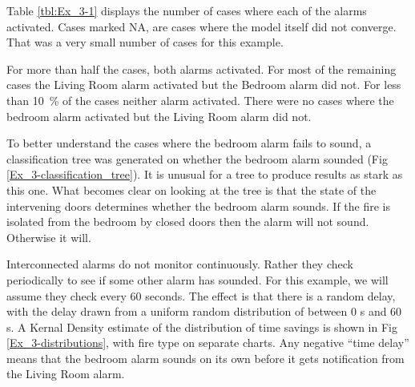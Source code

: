 \documentclass[12pt,twoside]{book}
\begin{document}
Table \ref{tbl:Ex_3-1} displays the number of cases where each of the alarms activated. Cases marked NA, are cases where the model itself did not converge. That was a very small number of cases for this example.

For more than half the cases, both alarms activated. For most of the remaining cases the Living Room alarm activated but the Bedroom alarm did not. For less than 10~\% of the cases neither alarm activated. There were no cases where the bedroom alarm activated but the Living Room alarm did not.

To better understand the cases where the bedroom alarm fails to sound, a classification tree was generated on whether the bedroom alarm sounded (Fig \ref{Ex_3-classification_tree}). It is unusual for a tree to produce results as stark as this one. What becomes clear on looking at the tree is that the state of the intervening doors determines whether the bedroom alarm sounds. If the fire is isolated from the bedroom by closed doors then the alarm will not sound. Otherwise it will.

Interconnected alarms do not monitor continuously. Rather they check periodically to see if some other alarm has sounded. For this example, we will assume they check every 60 seconds. The effect is that there is a random delay, with the delay drawn from a uniform random distribution of between 0 s and 60 s. A Kernal Density estimate of the distribution of time savings is shown in Fig \ref{Ex_3-distributions}, with fire type on separate charts. Any negative ``time delay'' means that the bedroom alarm sounds on its own before it gets notification from the Living Room alarm.
\end{document}
